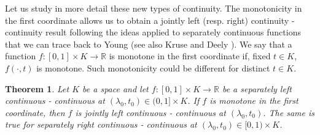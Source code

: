 \documentclass{amsart}
\newtheorem{theorem}{Theorem}[section]
\newcommand{\R}{{\mathbb{R}}}
\begin{document}
\bigskip
Let us study in more detail these new types of continuity.
The monotonicity in the first coordinate allows us to obtain a jointly left (resp. right) continuity - continuity result following the ideas applied to separately continuous functions that we can trace back to
Young \cite{Yo1910} (see also Kruse and Deely \cite{KD1969}). We say that a function $f:[0,1]\times K\rightarrow \R$ is monotone in the first coordinate if, fixed $t\in K$, $f(\cdot, t)$ is monotone. Such monotonicity could be different for distinct $t\in K$.

\begin{theorem}\label{th:jointlyLC}
Let $K$ be a space and let $f:[0,1]\times K\rightarrow \R$ be a separately left continuous - continuous at $(\lambda_0,t_0)\in(0,1]\times K$. If $f$ is monotone in the first coordinate, then $f$ is jointly left continuous - continuous at $(\lambda_0,t_0)$.
The same is true for separately right continuous - continuous at $(\lambda_0,t_0)\in[0,1)\times K$.
\end{theorem}
\end{document}

